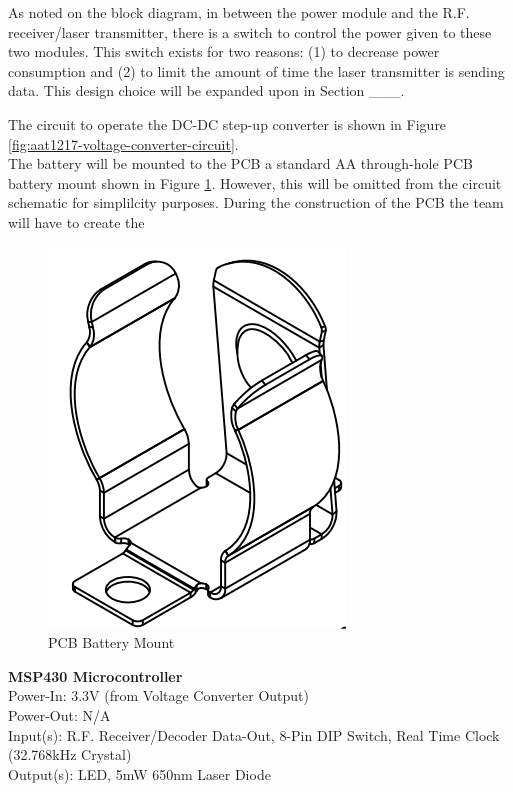 \documentclass[letterpaper,10pt]{article}
\begin{document}
\begin{spacing}{1.15}
As noted on the block diagram, in between the power module and the R.F. receiver/laser transmitter, there is a switch to control the power given to these two modules. This switch exists for two reasons: (1) to decrease power consumption and (2) to limit the amount of time the laser transmitter is sending data. This design choice will be expanded upon in Section \_\_\_.

The circuit to operate the DC-DC step-up converter is shown in Figure \ref{fig:aat1217-voltage-converter-circuit}. \\



The battery will be mounted to the PCB a standard AA through-hole PCB battery mount shown in Figure \ref{fig:pcb-battery-mount}. However, this will be omitted from the circuit schematic for simplilcity purposes. During the construction of the PCB the team will have to create the 
\begin{figure} [H]
	\centering
	\includegraphics[scale=0.4]{PCB_Battery_Mount.png}
	\caption{PCB Battery Mount\label{fig:pcb-battery-mount}}
\end{figure}

\normalsize\textbf{MSP430 Microcontroller} \\
Power-In: 3.3V (from Voltage Converter Output) \\
Power-Out: N/A \\
Input(s): R.F. Receiver/Decoder Data-Out, 8-Pin DIP Switch,  Real Time Clock (32.768kHz Crystal) \\
Output(s): LED, 5mW 650nm Laser Diode


\end{spacing}
\end{document}
